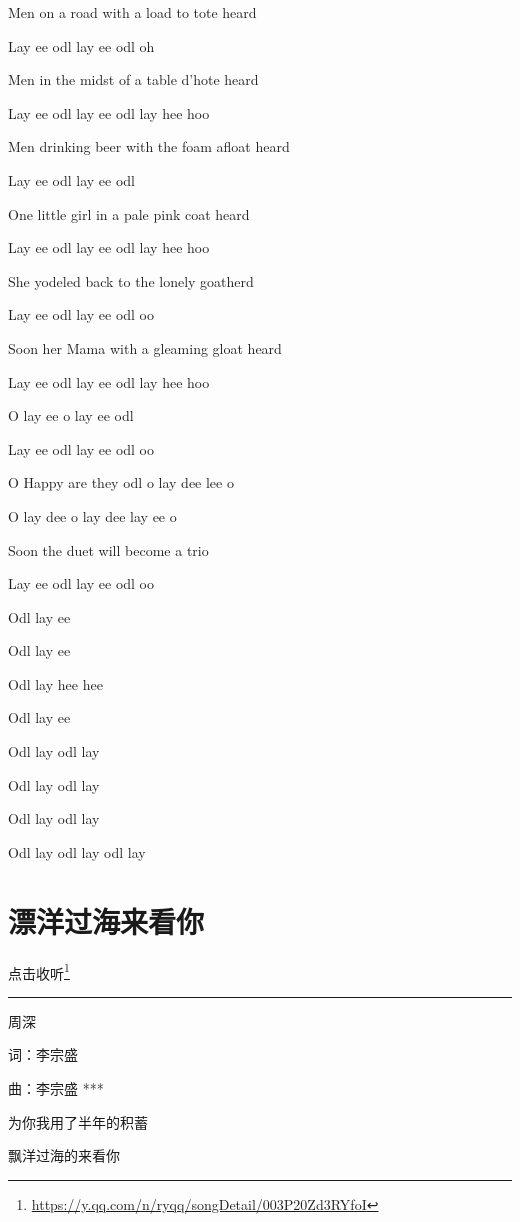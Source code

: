 \documentclass[]{ctexbook}
\renewcommand{\href}[2]{#2\footnote{\url{#1}}}
\begin{document}
Men on a road with a load to tote heard

Lay ee odl lay ee odl oh

Men in the midst of a table d'hote heard

Lay ee odl lay ee odl lay hee hoo

Men drinking beer with the foam afloat heard

Lay ee odl lay ee odl

One little girl in a pale pink coat heard

Lay ee odl lay ee odl lay hee hoo

She yodeled back to the lonely goatherd

Lay ee odl lay ee odl oo

Soon her Mama with a gleaming gloat heard

Lay ee odl lay ee odl lay hee hoo

O lay ee o lay ee odl

Lay ee odl lay ee odl oo

O Happy are they odl o lay dee lee o

O lay dee o lay dee lay ee o

Soon the duet will become a trio

Lay ee odl lay ee odl oo

Odl lay ee

Odl lay ee

Odl lay hee hee

Odl lay ee

Odl lay odl lay

Odl lay odl lay

Odl lay odl lay

Odl lay odl lay odl lay

\section*{漂洋过海来看你}\label{across-the-ocean-to-see-you}


\href{https://y.qq.com/n/ryqq/songDetail/003P20Zd3RYfoI}{点击收听}

\begin{center}\rule{0.5\linewidth}{0.5pt}\end{center}

周深

词：李宗盛

曲：李宗盛
***

为你我用了半年的积蓄

飘洋过海的来看你
\end{document}
